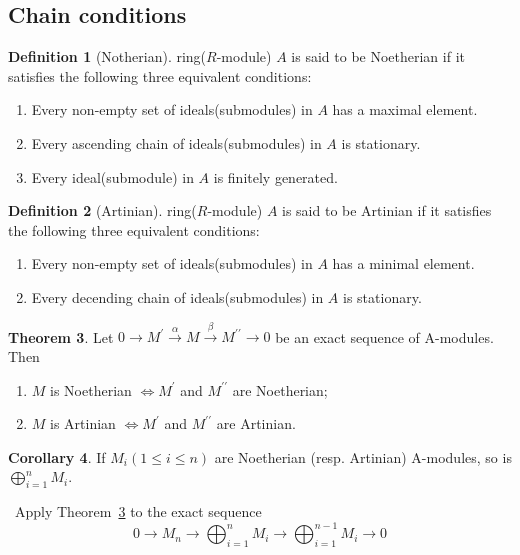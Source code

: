 \documentclass[a4paper,12pt]{article}
\newenvironment{prooff}{{\noindent\it\textcolor{cyan!40!black}{Proof}:}\,}{\par}
\newcommand{\rarr}[1]{\xrightarrow{#1}}
\theoremstyle{definition}
\newtheorem{defn}{Definition}[subsection]
\newtheorem{coro}[defn]{Corollary}
\newtheorem{theo}[defn]{Theorem}
\begin{document}
\subsection{Chain conditions}
\begin{defn}[Notherian]
    ring($R$-module) $A$ is said to be Noetherian if it satisfies the following three
    equivalent conditions:
    \begin{enumerate}[(1)]
        \item Every non-empty set of ideals(submodules) in $A$ has a maximal element.
        \item Every ascending chain of ideals(submodules) in $A$ is stationary.
        \item Every ideal(submodule) in $A$ is finitely generated.
    \end{enumerate}
\end{defn}
\begin{defn}[Artinian]
    ring($R$-module) $A$ is said to be Artinian if it satisfies the following three
    equivalent conditions:
    \begin{enumerate}[(1)]
        \item Every non-empty set of ideals(submodules)  in $A$ has a minimal element.
        \item Every decending chain of ideals(submodules) in $A$ is stationary.
    \end{enumerate}
\end{defn}
\begin{theo}
    Let $0 \rightarrow M^{\prime} \rarr{\alpha} M \rarr{\beta} M^{\prime \prime} \rightarrow 0$ be an exact sequence of A-modules. Then
    \begin{enumerate}
        \item $M$ is Noetherian $\Leftrightarrow M^{\prime}$ and $M^{\prime \prime}$ are Noetherian;
        \item $M$ is Artinian $\Leftrightarrow M^{\prime}$ and $M^{\prime \prime}$ are Artinian.
    \end{enumerate}
    \label{theorem:chain condition,exact sequence}
\end{theo}
\begin{coro}
    If $M_i(1 \leqslant i \leqslant n)$ are Noetherian (resp. Artinian) A-modules, so is $\bigoplus_{i=1}^n M_i$.
\end{coro}
\begin{prooff}
    Apply Theorem~\ref{theorem:chain condition,exact sequence} to the exact sequence
    $$
        0 \rightarrow M_n \rightarrow \bigoplus_{i=1}^n M_i \rightarrow \bigoplus_{i=1}^{n-1} M_i \rightarrow 0
    $$
\end{prooff}
\end{document}

